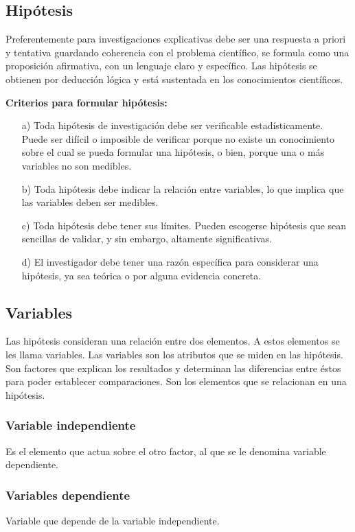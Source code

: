 \documentclass[a4paper, 12pt]{article}
\begin{document}
\subsection{Hipótesis}
Preferentemente para investigaciones explicativas debe ser una respuesta a priori y tentativa guardando coherencia con el problema científico, se formula como una proposición afirmativa, con un lenguaje claro y específico.  Las hipótesis se obtienen por deducción lógica y está sustentada en los conocimientos científicos. \par  
\vskip 0.3cm
{\bf Criterios para formular hipótesis:} \cite{Erica}
\begin{enumerate}
\item[a)] Toda hipótesis de investigación debe ser verificable estadísticamente.  Puede ser difícil o imposible de verificar porque no existe un conocimiento sobre el cual se pueda formular una hipótesis, o bien, porque una o más variables no son medibles.
\vskip 0.2cm
\item[b)] Toda hipótesis debe indicar la relación entre variables, lo que implica que las variables deben ser medibles.
\vskip 0.2cm
\item[c)] Toda hipótesis debe tener sus límites. Pueden escogerse hipótesis que sean sencillas de validar, y sin embargo, altamente significativas.
\vskip 0.2cm
\item[d)] El investigador debe tener una razón específica para considerar una hipótesis, ya sea teórica o por alguna evidencia concreta.    
\end{enumerate}


\subsection{Variables}
Las hipótesis consideran una relación entre dos elementos. A estos elementos se les llama variables. Las variables son los atributos que se miden en las hipótesis. Son factores que explican los resultados y determinan las diferencias entre éstos para poder establecer comparaciones. Son los elementos que se relacionan en una hipótesis. \cite{Erica} \par 
\vskip 0.2cm  
\subsubsection{Variable independiente}
Es el elemento que actua sobre el otro factor, al que se le denomina variable dependiente.

\subsubsection{Variables dependiente}
Variable que depende de la variable independiente.
\vskip 0.4cm
\end{document}
